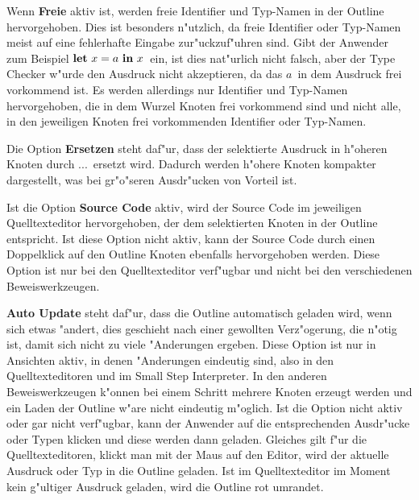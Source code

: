 Wenn {\bf Freie} aktiv ist, werden freie Identifier und Typ-Namen in der
Outline hervorgehoben. Dies ist besonders n"utzlich, da freie Identifier
oder Typ-Namen meist auf eine fehlerhafte Eingabe zur"uckzuf"uhren sind.
Gibt der Anwender zum Beispiel \glqq$\textbf{let}\ x = a\ \textbf{in}\ x$\grqq\ ein, ist 
dies nat"urlich nicht falsch, aber der Type Checker w"urde den Ausdruck
nicht akzeptieren, da das \glqq$a$\grqq\ in dem Ausdruck frei 
vorkommend ist. Es werden allerdings nur Identifier und Typ-Namen
hervorgehoben, die in dem Wurzel Knoten frei vorkommend sind und nicht
alle, in den jeweiligen Knoten frei vorkommenden Identifier oder Typ-Namen.

Die Option {\bf Ersetzen} steht daf"ur, dass der selektierte Ausdruck
in h"oheren Knoten durch \glqq...\grqq\ ersetzt wird. Dadurch
werden h"ohere Knoten kompakter dargestellt, was bei gr"o"seren Ausdr"ucken
von Vorteil ist.

Ist die Option {\bf Source Code} aktiv, wird der Source Code im jeweiligen
Quelltexteditor hervorgehoben, der dem selektierten Knoten in der Outline
entspricht. Ist diese Option nicht aktiv, kann der Source Code durch einen
Doppelklick auf den Outline Knoten ebenfalls hervorgehoben werden. Diese
Option ist nur bei den Quelltexteditor verf"ugbar und nicht bei den
verschiedenen Beweiswerkzeugen.

{\bf Auto Update} steht daf"ur, dass die Outline automatisch geladen wird,
wenn sich etwas "andert, dies geschieht nach einer gewollten Verz"ogerung,
die n"otig ist, damit sich nicht zu viele "Anderungen ergeben. Diese Option
ist nur in Ansichten aktiv, in denen "Anderungen eindeutig sind, also in den
Quelltexteditoren und im Small Step Interpreter. In den anderen
Beweiswerkzeugen k"onnen bei einem Schritt mehrere Knoten erzeugt werden
und ein Laden der Outline w"are nicht eindeutig m"oglich.
Ist die Option nicht aktiv oder gar nicht verf"ugbar, kann der Anwender auf 
die entsprechenden Ausdr"ucke oder Typen klicken und diese werden dann geladen.
Gleiches gilt f"ur die Quelltexteditoren, klickt man mit der Maus auf den
Editor, wird der aktuelle Ausdruck oder Typ in die Outline geladen. Ist im
Quelltexteditor im Moment kein g"ultiger Ausdruck geladen, wird die Outline
rot umrandet.



